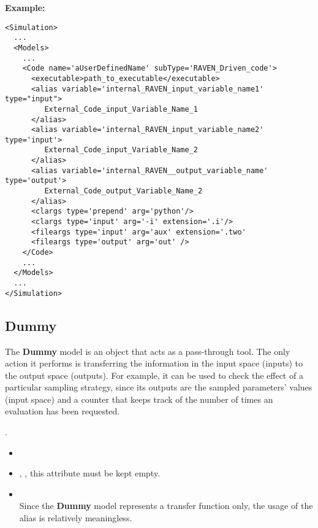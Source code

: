 \textbf{Example:}
\begin{lstlisting}[style=XML,morekeywords={subType,name,variable}]
<Simulation>
  ...
  <Models>
    ...
    <Code name='aUserDefinedName' subType='RAVEN_Driven_code'>
      <executable>path_to_executable</executable>
      <alias variable='internal_RAVEN_input_variable_name1' type="input">
         External_Code_input_Variable_Name_1
      </alias>
      <alias variable='internal_RAVEN_input_variable_name2' type='input'>
         External_Code_input_Variable_Name_2
      </alias>
      <alias variable='internal_RAVEN__output_variable_name' type='output'>
         External_Code_output_Variable_Name_2
      </alias>
      <clargs type='prepend' arg='python'/>
      <clargs type='input' arg='-i' extension='.i'/>
      <fileargs type='input' arg='aux' extension='.two'
      <fileargs type='output' arg='out' />
    </Code>
    ...
  </Models>
  ...
</Simulation>
\end{lstlisting}

\subsection{Dummy}
\label{subsec:models_dummy}
The \textbf{Dummy} model is an object that acts as a pass-through tool.
%
The only action it performs is transferring the information in the input
space (inputs) to the output space (outputs).
%
For example, it can be used to check the effect of a particular sampling
strategy, since its outputs are the sampled parameters' values (input space) and
a counter that keeps track of the number of times an evaluation has been
requested.
%

.
%
\attrsIntro
%
\vspace{-5mm}
\begin{itemize}
  \itemsep0em
  \item \nameDescription
  \item {}, , this attribute
  must be kept empty.
\end{itemize}
\vspace{-5mm}

\subnodesIntro
%
\begin{itemize}
  \item {}
  \\Since the \textbf{Dummy} model represents a transfer function only, the usage of the alias is relatively meaningless.
\end{itemize}

